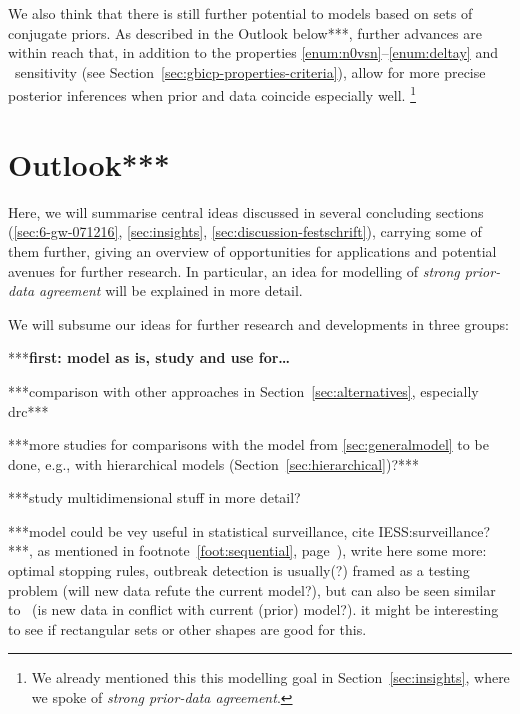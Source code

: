 We also think that there is still further potential to models based on sets of conjugate priors.
As described in the Outlook below***,
further advances are within reach 
that, in addition to the properties \ref{enum:n0vsn}--\ref{enum:deltay} and \pdc\ sensitivity
(see Section~\ref{sec:gbicp-properties-criteria}),
allow for more precise posterior inferences when prior and data coincide especially well.%
\footnote{We already mentioned this this modelling goal in Section~\ref{sec:insights},
where we spoke of \emph{strong prior-data agreement}.}



\section{Outlook***}
\label{sec:concluding-outlook}

Here, we will summarise central ideas discussed in several concluding sections
(\ref{sec:6-gw-071216}, \ref{sec:insights}, \ref{sec:discussion-festschrift}),
carrying some of them further, giving an overview of %
opportunities for applications and potential avenues for further research.
In particular, an idea for modelling of \emph{strong prior-data agreement} will be explained in more detail.

We will subsume our ideas for further research and developments in three groups:

***\textbf{first: model as is, study and use for\dots }

***comparison with other approaches in Section~\ref{sec:alternatives}, especially drc***

***more studies for comparisons with the model from \ref{sec:generalmodel} to be done,
e.g., with hierarchical models (Section~\ref{sec:hierarchical})?***

***study multidimensional stuff in more detail?

***model could be vey useful in statistical surveillance, cite IESS:surveillance?***,
as mentioned in footnote~\ref{foot:sequential}, page~\pageref{foot:sequential}),
write here some more: optimal stopping rules, outbreak detection is usually(?)
framed as a testing problem (will new data refute the current model?),
but can also be seen similar to \pdc\ (is new data in conflict with current (prior) model?).
it might be interesting to see if rectangular sets or other shapes are good for this.  

